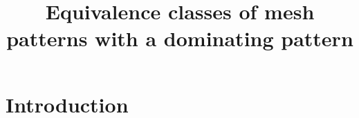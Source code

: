 \documentclass[11pt, a4paper]{amsart}
\title{Equivalence classes of mesh patterns with a dominating pattern}
\begin{document}

\maketitle
\thispagestyle{empty}
\section{Introduction}

\printbibliography
\end{document}
